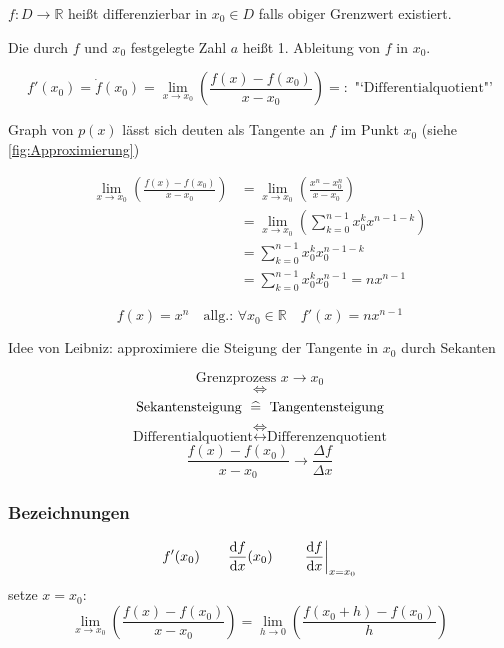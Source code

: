 \begin{definition}[1. Ableitung]
	\( f:D\rightarrow \mathbb{R} \) heißt differenzierbar in \( x_0 \in D \) falls obiger Grenzwert existiert.
\end{definition}
\begin{note}
  Die durch \( f \) und \( x_0 \) festgelegte Zahl \( a \) heißt 1. Ableitung von \( f \) in \( x_0 \).


\begin{equation*}
	f'(x_0) = \dot{f}(x_0) = \lim_{x\rightarrow x_0}\left(\frac{f(x)-f(x_0)}{x-x_0}\right) =:\text{ "`Differentialquotient"'}
\end{equation*}

\end{note}

\begin{note}
  Graph von \( p(x) \) lässt sich deuten als Tangente an \( f \) im Punkt \( x_0 \) (siehe \ref{fig:Approximierung})
\end{note}

\begin{example}[Einfache Differentiationsgleichung \( f(x)=x^n \)]
\begin{align*}
	\lim_{x \rightarrow x_0} \left(\frac{f(x)-f(x_0)}{x-x_0} \right)
	&= \lim_{x \rightarrow x_0} \left(\frac{x^n-x_0^n}{x-x_0}\right) \\
	&= \lim_{x \rightarrow x_0} \left(\sum_{k=0}^{n-1}x_0^kx^{n-1-k}\right) \\
	&= \sum_{k=0}^{n-1}x_0^kx_0^{n-1-k} \\
	&= \sum_{k=0}^{n-1}x_0^kx_0^{n-1} = nx^{n-1} 
\end{align*}

\[
	f(x)=x^n \quad \text{allg.: } \forall x_0 \in \mathbb{R} \quad f'(x)=nx^{n-1}
\]
\end{example}
\noindent Idee von Leibniz: approximiere die Steigung der Tangente in \( x_0 \) durch Sekanten

\[	\text{Grenzprozess } x \rightarrow x_0 \]
\[	\Leftrightarrow \]
\[	\text{Sekantensteigung } \mathrel{\widehat{=}} \text{ Tangentensteigung} \]
\[	\Leftrightarrow \]
\[	\text{Differentialquotient} \leftrightarrow \text{Differenzenquotient} \]
\[	\frac{f(x)-f(x_0)}{x-x_0} \rightarrow \frac{\Delta f}{\Delta x}\]

\subsubsection*{Bezeichnungen}
\begin{equation*}
	f'(x_0) \qquad \frac{\mathrm d f}{\mathrm d x}(x_0) \qquad \left.\frac{\mathrm d f}{\mathrm d x}\right|_{x=x_0}
\end{equation*}
%
setze \( x = x_0 \):
\begin{equation*}
  \lim_{x \rightarrow x_0}\left(\frac{f(x)-f(x_0)}{x-x_0}\right) = \lim_{h \rightarrow 0}\left(\frac{f(x_0+h)-f(x_0)}{h}\right)
\end{equation*}

